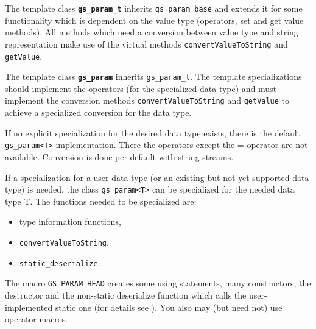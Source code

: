 The template class {\bf \lstinline|gs_param_t|} inherits \lstinline|gs_param_base| and extends it for some functionality which is dependent on the value type (operators, set and get value methods). All methods which need a conversion between value type and string representation make use of the virtual methods \lstinline|convertValueToString| and \lstinline|getValue|.

The template class {\bf \lstinline|gs_param|} inherits \lstinline|gs_param_t|. The template specializations should implement the operators (for the specialized data type) and must implement the conversion methods \lstinline|convertValueToString| and \lstinline|getValue| to achieve a specialized conversion for the data type.

If no explicit specialization for the desired data type exists, there is the default \lstinline|gs_param<T>| implementation. There the operators except the = operator are not available. Conversion is done per default with string streams.

If a specialization for a user data type (or an existing but not yet supported data type) is needed, the class
\mbox{\lstinline|gs_param<T>|} can be specialized for the needed data type T. The functions needed
to be specialized are: 
\begin{itemize}
  \item type information functions, 
  \item \lstinline|convertValueToString|, 
  \item \mbox{\lstinline|static_deserialize|.} 
\end{itemize}
The macro \lstinline|GS_PARAM_HEAD| creates some using statements, many constructors, the destructor and the non-static deserialize function which calls the user-implemented static one (for details see ). You also may (but need not) use operator macros. 

